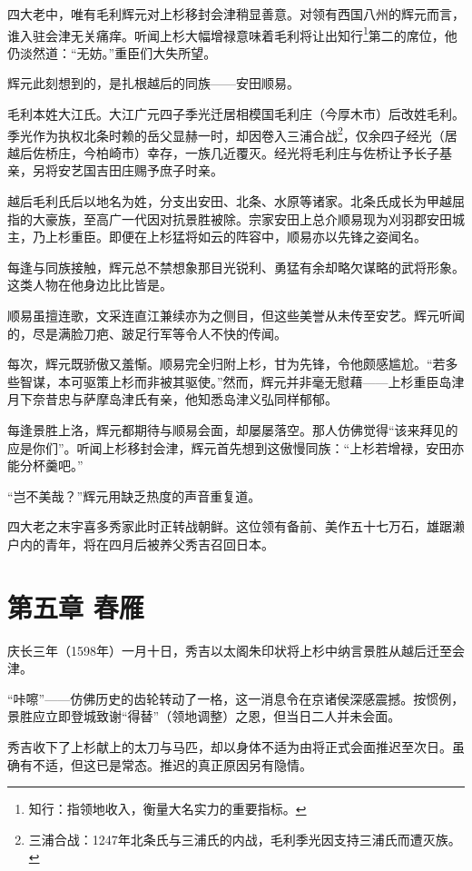 \documentclass[
]{book}
\begin{document}
四大老中，唯有毛利辉元对上杉移封会津稍显善意。对领有西国八州的辉元而言，谁入驻会津无关痛痒。听闻上杉大幅增禄意味着毛利将让出知行\footnote{知行：指领地收入，衡量大名实力的重要指标。}第二的席位，他仍淡然道：``无妨。''重臣们大失所望。

辉元此刻想到的，是扎根越后的同族------安田顺易。

毛利本姓大江氏。大江广元四子季光迁居相模国毛利庄（今厚木市）后改姓毛利。季光作为执权北条时赖的岳父显赫一时，却因卷入三浦合战\footnote{三浦合战：1247年北条氏与三浦氏的内战，毛利季光因支持三浦氏而遭灭族。}，仅余四子经光（居越后佐桥庄，今柏崎市）幸存，一族几近覆灭。经光将毛利庄与佐桥让予长子基亲，另将安艺国吉田庄赐予庶子时亲。

越后毛利氏后以地名为姓，分支出安田、北条、水原等诸家。北条氏成长为甲越屈指的大豪族，至高广一代因对抗景胜被除。宗家安田上总介顺易现为刈羽郡安田城主，乃上杉重臣。即便在上杉猛将如云的阵容中，顺易亦以先锋之姿闻名。

每逢与同族接触，辉元总不禁想象那目光锐利、勇猛有余却略欠谋略的武将形象。这类人物在他身边比比皆是。

顺易虽擅连歌，文采连直江兼续亦为之侧目，但这些美誉从未传至安艺。辉元听闻的，尽是满脸刀疤、跛足行军等令人不快的传闻。

每次，辉元既骄傲又羞惭。顺易完全归附上杉，甘为先锋，令他颇感尴尬。``若多些智谋，本可驱策上杉而非被其驱使。''然而，辉元并非毫无慰藉------上杉重臣岛津月下奈昔忠与萨摩岛津氏有亲，他知悉岛津义弘同样郁郁。

每逢景胜上洛，辉元都期待与顺易会面，却屡屡落空。那人仿佛觉得``该来拜见的应是你们''。听闻上杉移封会津，辉元首先想到这傲慢同族：``上杉若增禄，安田亦能分杯羹吧。''

``岂不美哉？''辉元用缺乏热度的声音重复道。

四大老之末宇喜多秀家此时正转战朝鲜。这位领有备前、美作五十七万石，雄踞濑户内的青年，将在四月后被养父秀吉召回日本。

\chapter*{第五章 春雁}\label{ux7b2cux4e94ux7ae0-ux6625ux96c1}

庆长三年（1598年）一月十日，秀吉以太阁朱印状将上杉中纳言景胜从越后迁至会津。

``咔嚓''------仿佛历史的齿轮转动了一格，这一消息令在京诸侯深感震撼。按惯例，景胜应立即登城致谢``得替''（领地调整）之恩，但当日二人并未会面。

秀吉收下了上杉献上的太刀与马匹，却以身体不适为由将正式会面推迟至次日。虽确有不适，但这已是常态。推迟的真正原因另有隐情。
\end{document}
